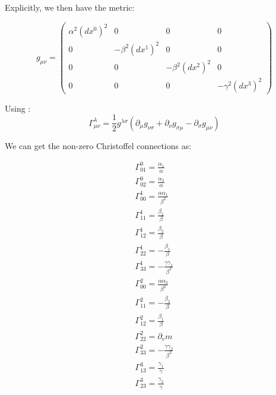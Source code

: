 \documentclass{article}
\begin{document}
Explicitly, we then have the metric:

\begin{equation}
g_{\mu\nu}=\left(\begin{array}{cccc}
\alpha^{2}\left(dx^{0}\right)^{2} & 0 & 0 & 0\\
0 & -\beta^{2}\left(dx^{1}\right)^{2} & 0 & 0\\
0 & 0 & -\beta^{2}\left(dx^{2}\right)^{2} & 0\\
0 & 0 & 0 & -\gamma^{2}\left(dx^{3}\right)^{2}
\end{array}\right)\label{eq:general-axisymmetric-static-matrix-metric}
\end{equation}

Using \cite{carroll2003spacetime}: 
\begin{equation}
\Gamma_{\mu\nu}^{\lambda}=\frac{1}{2}g^{\lambda\sigma}\left(\partial_{\mu}g_{\nu\sigma}+\partial_{\nu}g_{\sigma\mu}-\partial_{\sigma}g_{\mu\nu}\right)
\end{equation}

We can get the non-zero Christoffel connections as:

\begin{center}
\begin{equation}
\begin{array}{c}
\Gamma_{01}^{0}=\frac{\alpha_{1}}{\alpha}\\
\Gamma_{02}^{0}=\frac{\alpha_{2}}{\alpha}\\
\Gamma_{00}^{1}=\frac{\alpha \alpha_{1}}{\beta^{2}}\\
\Gamma_{11}^{1}=\frac{\beta_{1}}{\beta}\\
\Gamma_{12}^{1}=\frac{\beta_{2}}{\beta}\\
\Gamma_{22}^{1}=-\frac{\beta_{1}}{\beta}\\
\Gamma_{33}^{1}=-\frac{\gamma\gamma_{1}}{\beta^{2}}\\
\Gamma_{00}^{2}=\frac{\alpha\alpha_{2}}{\beta^{2}}\\
\Gamma_{11}^{2}=-\frac{\beta_{2}}{\beta}\\
\Gamma_{12}^{2}=\frac{\beta_{1}}{\beta}\\ 
\Gamma_{22}^{2}=\partial_{v}m\\
\Gamma_{33}^{2}=-\frac{\gamma\gamma_{2}}{\beta^{2}}\\
\Gamma_{13}^{3}=\frac{\gamma_{1}}{\gamma}\\
\Gamma_{23}^{3}=\frac{\gamma_{2}}{\gamma}\\
\end{array}
\end{equation}
\end{center}
\end{document}
